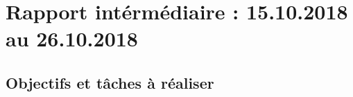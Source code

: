\chapter{Rapport intérmédiaire : 15.10.2018 au 26.10.2018}

\section{Objectifs et tâches à réaliser}




